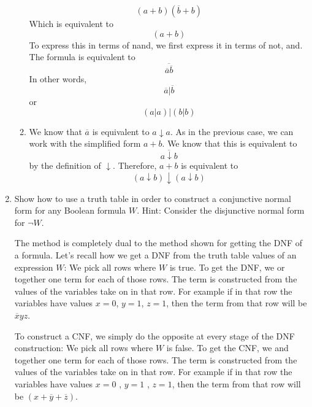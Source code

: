 \documentclass[12pt]{amsart}
\newcommand{\ov}[1]{\overline{#1}}
\begin{document}
\begin{enumerate}
\begin{enumerate}
        \[
        (a+ b)(\overline{b} + b)
        \]
        Which is equivalent to
        \[
        (a+b)
        \]
        To express this in terms of nand, we first express it in terms
        of not, and. The formula is equivalent to
        \[
        \ov{\ov{a} \ov{b}}
        \]
        In other words,
        \[
        \overline{a} \vert \overline{b}
        \]
        or
        \[
        \left( a \vert a \right) \vert \left(b \vert b \right)
        \]
    \item
        We know that $\overline{a}$ is equivalent to $a \downarrow a$. As in the
        previous case, we can work with the simplified form $a+b$. We know
        that this is equivalent to
        \[
        \overline{ a \downarrow b}
        \]
        by the definition of $\downarrow$.
        Therefore,  $a + b $ is equivalent to
        \[
        \left( a \downarrow b \right) \downarrow \left( a \downarrow b \right)
        \]
    \end{enumerate}
\item
    Show how to use a truth table in order to construct a conjunctive
    normal form for any Boolean formula $W$. Hint: Consider the
    disjunctive normal form for $\neg W$.\\

    The method is completely dual to the method shown for getting the
    DNF  of a formula. Let's recall how we get a DNF from the truth
    table values of an expression $W$: We pick all rows where $W$
    is true. To get the DNF, we or together one term for each of those
    rows. The term is constructed from the values of the variables
    take on in that row. For example if in that row the variables
    have values $x = 0$, $y= 1$, $z=1$, then the term from that row
    will be $\overline{x} y z$.

    To construct a CNF, we simply do the opposite at every stage
    of the DNF construction: We pick all rows where $W$ is false.
    To get the CNF, we and together one term for each of those rows.
    The term is constructed from the values of the variables take on in
    that row. For example if in that row the variables have values
    $x= 0$ , $y= 1$ , $z =1$, then the term from that row will be
    $( x + \overline{y} + \overline{z})$.


\end{enumerate}
\end{document}
